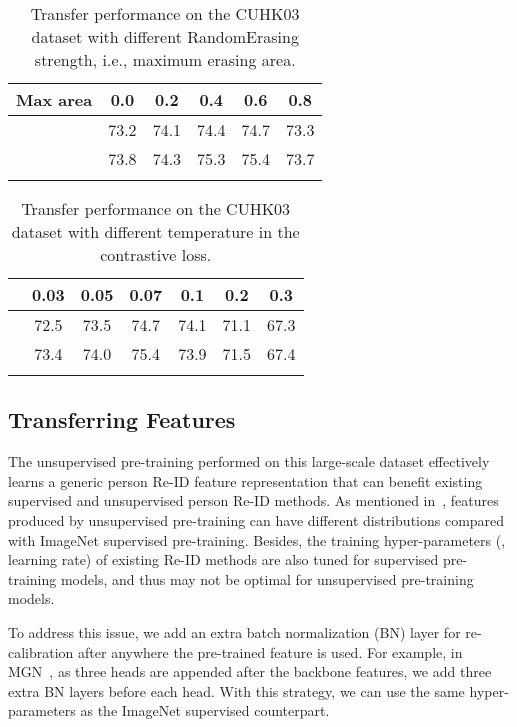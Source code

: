 \documentclass[final]{cvpr}
\begin{document}
\begin{table}[!t]
\setlength{\tabcolsep}{3.6mm}
    \centering
    \small
    \begin{tabular}{l|ccccc} 
    \shline
     Max area & 0.0 & 0.2 & 0.4  & 0.6  & 0.8 \\ 
     \hline
       & 73.2 & 74.1 & 74.4 & 74.7 & 73.3 \\
     \hline
      & 73.8 & 74.3 & 75.3 & 75.4 & 73.7 \\
     \shline
    \end{tabular}
\caption{Transfer performance on the CUHK03 dataset with different RandomErasing strength, i.e., maximum erasing area.}
\label{tab:randomerasing}
\end{table}

\begin{table}[!t]
\setlength{\tabcolsep}{3mm}
    \centering
\small
    \begin{tabular}{l|cccccc} 
    \shline
      & 0.03 & 0.05 & 0.07 & 0.1  & 0.2  & 0.3 \\ 
     \hline
       & 72.5 & 73.5 & 74.7 & 74.1 & 71.1 & 67.3 \\
      & 73.4 & 74.0 & 75.4 & 73.9 & 71.5 & 67.4 \\
     \shline
    \end{tabular}
\caption{Transfer performance on the CUHK03 dataset with different temperature  in the contrastive loss.}
\label{tab:temperature}
\end{table}

\subsection{Transferring Features}
\label{sec:transfer_feature}
The unsupervised pre-training performed on this large-scale dataset effectively learns a generic person Re-ID feature representation that can benefit existing supervised and unsupervised person Re-ID methods. As mentioned in~\cite{he2020momentum}, features produced by unsupervised pre-training can have different distributions compared with ImageNet supervised pre-training. Besides, the training hyper-parameters (\eg, learning rate) of existing Re-ID methods are also tuned for supervised pre-training models, and thus may not be optimal for unsupervised pre-training models.

To address this issue, we add an extra batch normalization (BN) layer for re-calibration after anywhere the pre-trained feature is used. For example, in MGN~\cite{wang2018learning}, as three heads are appended after the backbone features, we add three extra BN layers before each head. With this strategy, we can use the same hyper-parameters as the ImageNet supervised counterpart. 
\end{document}
